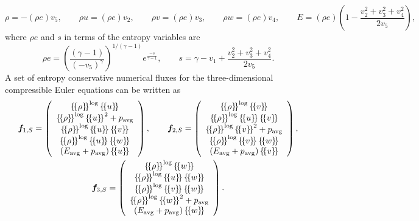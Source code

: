 \documentclass[preprint,10pt]{article}
\theoremstyle{definition}
\theoremstyle{lemma}
\theoremstyle{theorem}
\theoremstyle{assumption}
\newcommand{\LRp}[1]{\left( #1 \right)}
\newcommand{\LRc}[1]{\left\{ #1 \right\}}
\newcommand{\avg}[1] {\ensuremath{\LRc{\!\{#1\}\!}}}
\begin{document}
{\begin{equation}
\rho = -(\rho e) v_5, \qquad \rho u = (\rho e) v_2, \qquad \rho v = (\rho e) v_3, \qquad \rho w = (\rho e) v_4, \qquad E = (\rho e)\LRp{1 - \frac{{v_2^2+v_3^2+v_4^2}}{2 v_5}},
\end{equation}
where $\rho e$ and $s$ in terms of the entropy variables are 
\begin{equation}
\rho e = \LRp{\frac{(\gamma-1)}{\LRp{-v_5}^{\gamma}}}^{1/(\gamma-1)}e^{\frac{-s}{\gamma-1}}, \qquad s = \gamma - v_1 + \frac{{v_2^2+v_3^2+v_4^2}}{2v_5}.
\end{equation}
A set of entropy conservative numerical fluxes for the three-dimensional compressible Euler equations can be written as
\begin{gather}
\bm{f}_{1,S} = \LRp{\begin{array}{c}
\avg{\rho}^{\log}\avg{u}\\
\avg{\rho}^{\log}\avg{u}^2 + p_{\rm avg}\\
\avg{\rho}^{\log}\avg{u}\avg{v}\\
\avg{\rho}^{\log}\avg{u}\avg{w}\\
(E_{\rm avg}+ p_{\rm avg})\avg{u}\\
\end{array}}, 
\qquad 
\bm{f}_{2,S} = \LRp{\begin{array}{c}
\avg{\rho}^{\log}\avg{v}\\
\avg{\rho}^{\log}\avg{u}\avg{v}\\
\avg{\rho}^{\log}\avg{v}^2 + p_{\rm avg}\\
\avg{\rho}^{\log}\avg{v}\avg{w}\\
(E_{\rm avg}+ p_{\rm avg})\avg{v}\\
\end{array}},\\
\bm{f}_{3,S} = \LRp{\begin{array}{c}
\avg{\rho}^{\log}\avg{w}\\
\avg{\rho}^{\log}\avg{u}\avg{w}\\
\avg{\rho}^{\log}\avg{v}\avg{w}\\
\avg{\rho}^{\log}\avg{w}^2 + p_{\rm avg}\\
(E_{\rm avg}+ p_{\rm avg})\avg{w}\\
\end{array}}.\nonumber

\end{gather}}
\end{document}
